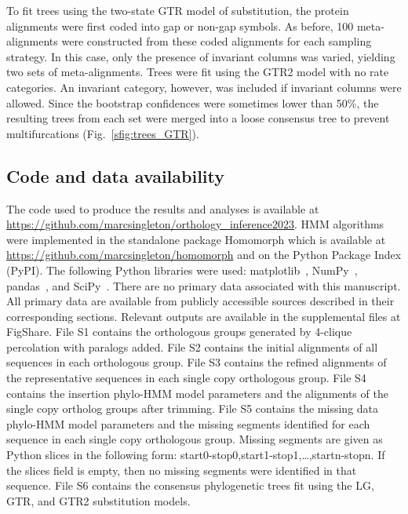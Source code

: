 To fit trees using the two-state GTR model of substitution, the protein alignments were first coded into gap or non-gap symbols. As before, 100 meta-alignments were constructed from these coded alignments for each sampling strategy. In this case, only the presence of invariant columns was varied, yielding two sets of meta-alignments. Trees were fit using the GTR2 model with no rate categories. An invariant category, however, was included if invariant columns were allowed. Since the bootstrap confidences were sometimes lower than 50\%, the resulting trees from each set were merged into a loose consensus tree to prevent multifurcations (Fig.~\ref{sfig:trees_GTR}).

\subsection{Code and data availability}
\begin{sloppypar}
The code used to produce the results and analyses is available at \url{https://github.com/marcsingleton/orthology_inference2023}. HMM algorithms were implemented in the standalone package Homomorph which is available at \url{https://github.com/marcsingleton/homomorph} and on the Python Package Index (PyPI). The following Python libraries were used: matplotlib~\cite{Hunter2007}, NumPy~\cite{Harris2020}, pandas~\cite{McKinney2010}, and SciPy~\cite{Virtanen2020}. There are no primary data associated with this manuscript. All primary data are available from publicly accessible sources described in their corresponding sections. Relevant outputs are available in the supplemental files at FigShare. File S1 contains the orthologous groups generated by 4-clique percolation with paralogs added. File S2 contains the initial alignments of all sequences in each orthologous group. File S3 contains the refined alignments of the representative sequences in each single copy orthologous group. File S4 contains the insertion phylo-HMM model parameters and the alignments of the single copy ortholog groups after trimming. File S5 contains the missing data phylo-HMM model parameters and the missing segments identified for each sequence in each single copy orthologous group. Missing segments are given as Python slices in the following form: start0-stop0,start1-stop1,\ldots,startn-stopn. If the slices field is empty, then no missing segments were identified in that sequence. File S6 contains the consensus phylogenetic trees fit using the LG, GTR, and GTR2 substitution models.
\end{sloppypar}
